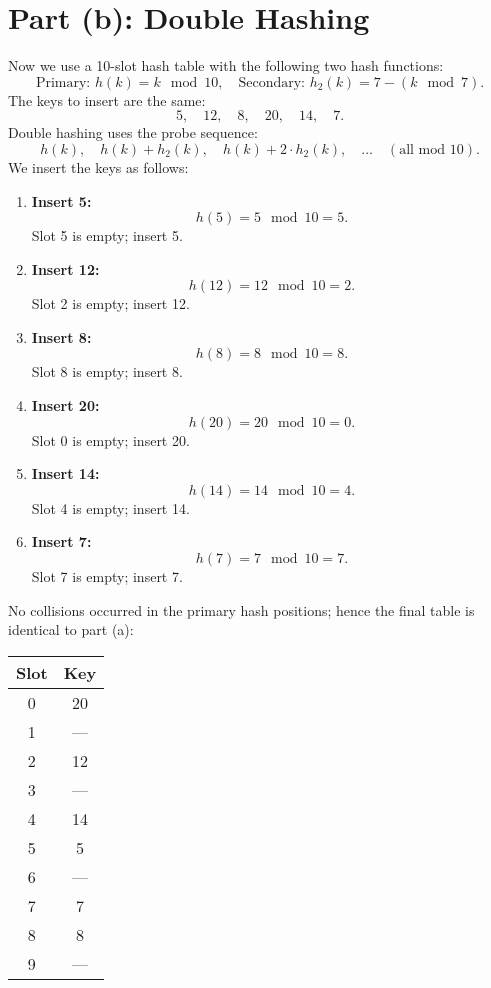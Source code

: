\documentclass{article}
\begin{document}
\section*{Part (b): Double Hashing}

Now we use a 10-slot hash table with the following two hash functions:
\[
\text{Primary: } h(k)= k \mod 10,\quad \text{Secondary: } h_2(k)=7 - (k \mod 7).
\]
The keys to insert are the same: 
\[
5,\quad 12,\quad 8,\quad 20,\quad 14,\quad 7.
\]
Double hashing uses the probe sequence:
\[
h(k),\quad h(k)+h_2(k),\quad h(k)+2\cdot h_2(k),\quad \dots \quad (\text{all mod }10).
\]
We insert the keys as follows:
\begin{enumerate}[label=\textbf{Step \arabic*:}, leftmargin=1.8cm]
    \item \textbf{Insert 5:} 
    \[
    h(5)=5 \mod 10 = 5.
    \]
    Slot 5 is empty; insert 5.
    \item \textbf{Insert 12:} 
    \[
    h(12)=12 \mod 10 = 2.
    \]
    Slot 2 is empty; insert 12.
    \item \textbf{Insert 8:} 
    \[
    h(8)=8 \mod 10 = 8.
    \]
    Slot 8 is empty; insert 8.
    \item \textbf{Insert 20:} 
    \[
    h(20)=20 \mod 10 = 0.
    \]
    Slot 0 is empty; insert 20.
    \item \textbf{Insert 14:} 
    \[
    h(14)=14 \mod 10 = 4.
    \]
    Slot 4 is empty; insert 14.
    \item \textbf{Insert 7:} 
    \[
    h(7)=7 \mod 10 = 7.
    \]
    Slot 7 is empty; insert 7.
\end{enumerate}

No collisions occurred in the primary hash positions; hence the final table is identical to part (a):

\bigskip
\begin{center}
\begin{tabular}{c|c}
\textbf{Slot} & \textbf{Key} \\ \midrule
0 & 20 \\
1 & --- \\
2 & 12 \\
3 & --- \\
4 & 14 \\
5 & 5 \\
6 & --- \\
7 & 7 \\
8 & 8 \\
9 & --- \\
\end{tabular}
\end{center}
\bigskip
\end{document}
